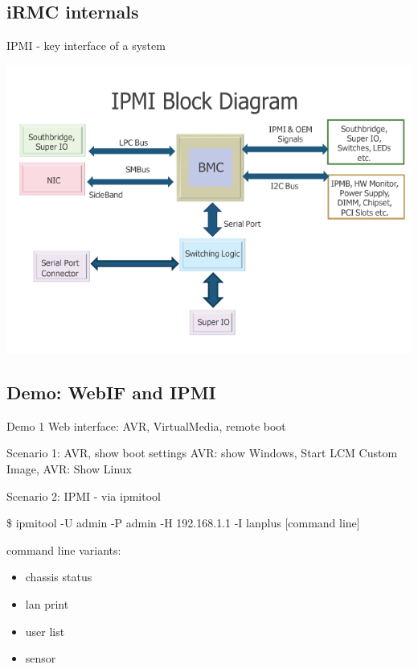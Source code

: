 \documentclass{beamer}
\begin{document}
   \subsection{iRMC internals}
   \begin{frame}{IPMI  - key interface of a system}
   	   \begin{center}
		   \includegraphics[scale=0.35]{ipmi-block-diagram.png}
   	   \end{center}
   \end{frame}

  \subsection{Demo: WebIF and IPMI}
  \begin{frame}{Demo 1}
	  Web interface:  AVR, VirtualMedia, remote boot

	  \begin{block}{Scenario 1: AVR, show boot settings}
		  AVR: show Windows, Start LCM Custom Image, AVR: Show Linux
	  \end{block}
	  \pause

	  \begin{block}{Scenario 2: IPMI - via ipmitool}

		  \small{\$ ipmitool -U admin -P admin -H 192.168.1.1 -I lanplus [command line]} \newline

		  command line variants:
		  \begin{itemize}
			  \item chassis status
			  \item lan print
			  \item user list
			  \item sensor	
		  \end{itemize}

	  \end{block}

  \end{frame}
\end{document}
